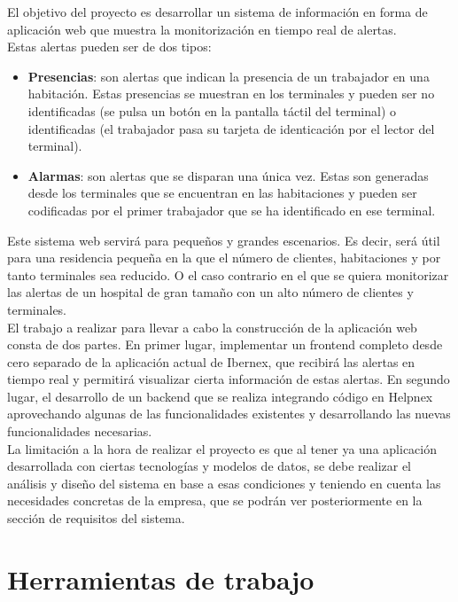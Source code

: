El objetivo del proyecto es desarrollar un sistema de información en forma de aplicación web que muestra la monitorización en tiempo real de alertas. \\

Estas alertas pueden ser de dos tipos:
\begin{itemize}
    \item \textbf{Presencias}: son alertas que indican la presencia de un trabajador en una habitación. Estas presencias se muestran en los terminales y pueden ser no identificadas (se pulsa un botón en la pantalla táctil del terminal) o identificadas (el trabajador pasa su tarjeta de identicación por el lector del terminal).
    \item \textbf{Alarmas}: son alertas que se disparan una única vez. Estas son generadas desde los terminales que se encuentran en las habitaciones y pueden ser codificadas por el primer trabajador que se ha identificado en ese terminal.    
\end{itemize}

Este sistema web servirá para pequeños y grandes escenarios. Es decir, será útil para una residencia pequeña en la que el número de clientes, habitaciones y por tanto terminales sea reducido. O el caso contrario en el que se quiera monitorizar las alertas de un hospital de gran tamaño con un alto número de clientes y terminales.\\

El trabajo a realizar para llevar a cabo la construcción de la aplicación web consta de dos partes. En primer lugar, implementar un frontend completo desde cero separado de la aplicación actual de Ibernex, que recibirá las alertas en tiempo real y permitirá visualizar cierta información de estas alertas. En segundo lugar, el desarrollo de un backend que se realiza integrando código en Helpnex aprovechando algunas de las funcionalidades existentes y desarrollando las nuevas funcionalidades necesarias. \\

La limitación a la hora de realizar el proyecto es que al tener ya una aplicación desarrollada con ciertas tecnologías y modelos de datos, se debe realizar el análisis y diseño del sistema en base a esas condiciones y teniendo en cuenta las necesidades concretas de la empresa, que se podrán ver posteriormente en la sección de requisitos del sistema.


\section{Herramientas de trabajo}

